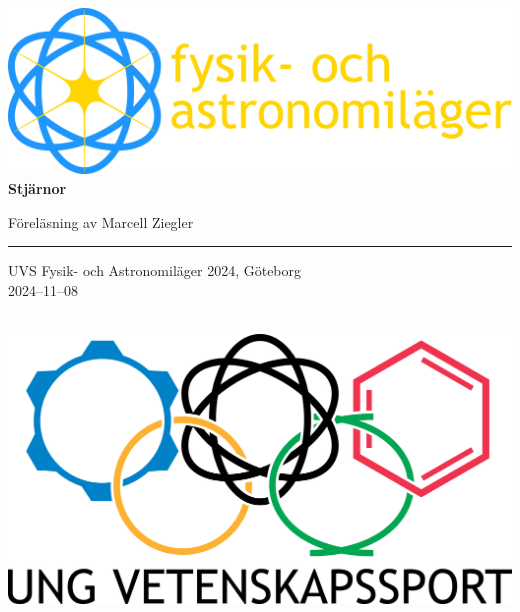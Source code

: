 \documentclass[12pt, a4paper]{article}
\begin{document}

    \begin{center}
        \noindent
        \vfill
        \includegraphics[width=.8\textwidth]{img/logga-fysiklager.png}
        \vfill
        {\Huge \textbf{Stjärnor}}\\[3pt]
        {\Large Föreläsning av Marcell Ziegler\\
        \rule{\textwidth}{2pt}
        UVS Fysik- och Astronomiläger 2024, Göteborg\\[2mm]
        2024--11--08}\\
        \vfill
        \includegraphics[width=.5\textwidth]{img/logga-uvs.png}
        \vfill
    \end{center}

    \newpage

    \setlength{\parskip}{0.6\baselineskip}
    \setlength{\parindent}{0pt}

    
    
    \solutionnewpage
    

    \newpage
    \appendix
    
\end{document}
